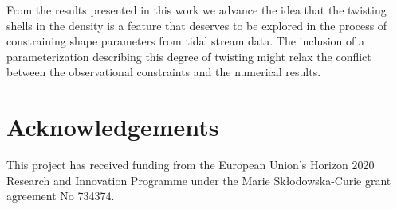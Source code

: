 \documentclass[usenatbib]{mnras}
\begin{document}
From the results presented in this work we advance the idea that the
twisting shells in the density is a feature that deserves to be
explored in the process of constraining shape parameters from tidal
stream data. 
The inclusion of a parameterization describing this degree of
twisting might relax the conflict between the observational
constraints and the numerical results. 


\section*{Acknowledgements}
This project has received funding from the European Union's Horizon
2020 Research and Innovation Programme under the Marie
Sk\l{}odowska-Curie grant agreement No 734374. 

 
 
\end{document}
